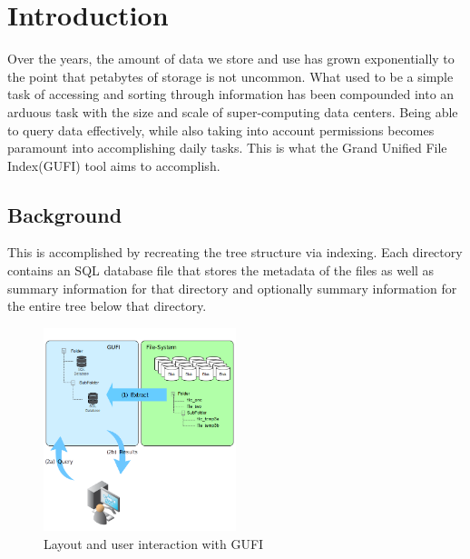 \section{Introduction}
Over the years, the amount of data we store and use has grown exponentially to the point that petabytes of storage is not uncommon. What used to be a simple task of accessing and sorting through information has been compounded into an arduous task with the size and scale of super-computing data centers. Being able to query data effectively, while also taking into account permissions becomes paramount into accomplishing daily tasks. This is what the Grand Unified File Index(GUFI) tool aims to accomplish. 

\subsection{Background}
This is accomplished by recreating the tree structure via indexing. Each directory contains an SQL database file that stores the metadata of the files as well as summary information for that directory and optionally summary information for the entire tree below that directory. 

\begin{figure} [h]
\centering
\includegraphics[width=0.5\textwidth]{images/gufi_structure.png}
\caption{\label{fig:gufi\_structure}Layout and user interaction with GUFI}
\end{figure}
